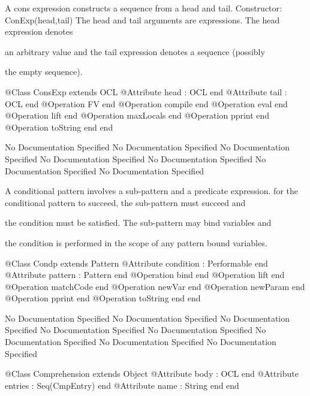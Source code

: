       A cons expression constructs a sequence from a head and tail.
      Constructor: ConExp(head,tail)
        The head and tail arguments are expressions. The head expression denotes

        an arbitrary value and the tail expression denotes a sequence (possibly

        the empty sequence).
\begin{Interface}
@Class ConsExp extends OCL
  @Attribute head : OCL end
  @Attribute tail : OCL end
  @Operation FV end
  @Operation compile end
  @Operation eval end
  @Operation lift end
  @Operation maxLocals end
  @Operation pprint end
  @Operation toString end
end
\end{Interface}
No Documentation Specified
No Documentation Specified
No Documentation Specified
No Documentation Specified
No Documentation Specified
No Documentation Specified
No Documentation Specified

     A conditional pattern involves a sub-pattern and a predicate expression.
     for the conditional pattern to succeed, the sub-pattern must succeed and

     the condition must be satisfied. The sub-pattern may bind variables and

     the condition is performed in the scope of any pattern bound variables.
\begin{Interface}
@Class Condp extends Pattern
  @Attribute condition : Performable end
  @Attribute pattern : Pattern end
  @Operation bind end
  @Operation lift end
  @Operation matchCode end
  @Operation newVar end
  @Operation newParam end
  @Operation pprint end
  @Operation toString end
end
\end{Interface}
No Documentation Specified
No Documentation Specified
No Documentation Specified
No Documentation Specified
No Documentation Specified
No Documentation Specified
No Documentation Specified
No Documentation Specified
\begin{Interface}
@Class Comprehension extends Object
  @Attribute body : OCL end
  @Attribute entries : Seq(CmpEntry) end
  @Attribute name : String end
end
\end{Interface}

